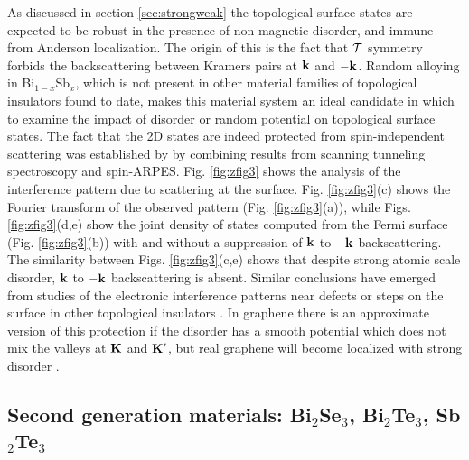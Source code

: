 \documentclass[twocolumn,floatfix,showpacs,rmp,aps]{revtex4}
\begin{document}
As discussed in section \ref{sec:strongweak}
the topological surface states are expected to be
robust in the presence of non magnetic disorder, and immune from
Anderson localization.  The origin of this is the fact that
${\cal T}$ symmetry forbids the backscattering between Kramers
pairs at ${\bf k}$ and $-{\bf k}$.
Random alloying in Bi$_{1-x}$Sb$_x$,
which is not present in other material families of topological
insulators found to date, makes this material system an ideal
candidate in which to examine the impact of disorder or random
potential on topological surface states. The fact that the
2D states are indeed protected from spin-independent
scattering was established by \textcite{roushan09} by
combining results from scanning tunneling spectroscopy and
spin-ARPES.  Fig. \ref{fig:zfig3} shows
the analysis of the interference pattern
due to scattering at the surface.
Fig. \ref{fig:zfig3}(c) shows the Fourier transform of the observed pattern
(Fig. \ref{fig:zfig3}(a)),
while Figs. \ref{fig:zfig3}(d,e) show the joint density of states computed from
the Fermi surface (Fig. \ref{fig:zfig3}(b))
with and without a suppression of ${\bf k}$ to $-{\bf k}$
backscattering.  The similarity between Figs. \ref{fig:zfig3}(c,e) shows that
despite strong atomic scale disorder,
${\bf k}$ to $-{\bf k}$ backscattering is absent.
Similar conclusions have emerged from studies of the electronic interference
patterns near defects or steps on the surface in other topological insulators
\cite{urazhdin04,zhangt09,alpichshev10}.  In graphene there is an approximate version of
this protection if the disorder has a smooth potential which does
not mix the valleys at ${\bf K}$ and ${\bf K}'$, but real graphene
will become localized with strong disorder \cite{neto09}.

\subsection{Second generation materials: Bi$_2$Se$_3$, Bi$_2$Te$_3$, Sb$_2$Te$_3$}
\label{sec:bise}
\end{document}

